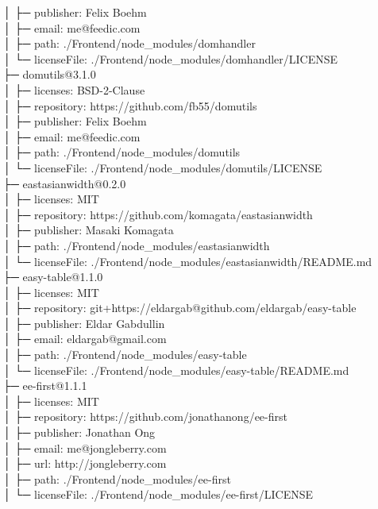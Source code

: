 │  ├─ publisher: Felix Boehm\\
│  ├─ email: me@feedic.com\\
│  ├─ path: ./Frontend/node\_modules/domhandler\\
│  └─ licenseFile: ./Frontend/node\_modules/domhandler/LICENSE\\
├─ domutils@3.1.0\\
│  ├─ licenses: BSD-2-Clause\\
│  ├─ repository: https://github.com/fb55/domutils\\
│  ├─ publisher: Felix Boehm\\
│  ├─ email: me@feedic.com\\
│  ├─ path: ./Frontend/node\_modules/domutils\\
│  └─ licenseFile: ./Frontend/node\_modules/domutils/LICENSE\\
├─ eastasianwidth@0.2.0\\
│  ├─ licenses: MIT\\
│  ├─ repository: https://github.com/komagata/eastasianwidth\\
│  ├─ publisher: Masaki Komagata\\
│  ├─ path: ./Frontend/node\_modules/eastasianwidth\\
│  └─ licenseFile: ./Frontend/node\_modules/eastasianwidth/README.md\\
├─ easy-table@1.1.0\\
│  ├─ licenses: MIT\\
│  ├─ repository: git+https://eldargab@github.com/eldargab/easy-table\\
│  ├─ publisher: Eldar Gabdullin\\
│  ├─ email: eldargab@gmail.com\\
│  ├─ path: ./Frontend/node\_modules/easy-table\\
│  └─ licenseFile: ./Frontend/node\_modules/easy-table/README.md\\
├─ ee-first@1.1.1\\
│  ├─ licenses: MIT\\
│  ├─ repository: https://github.com/jonathanong/ee-first\\
│  ├─ publisher: Jonathan Ong\\
│  ├─ email: me@jongleberry.com\\
│  ├─ url: http://jongleberry.com\\
│  ├─ path: ./Frontend/node\_modules/ee-first\\
│  └─ licenseFile: ./Frontend/node\_modules/ee-first/LICENSE\\

